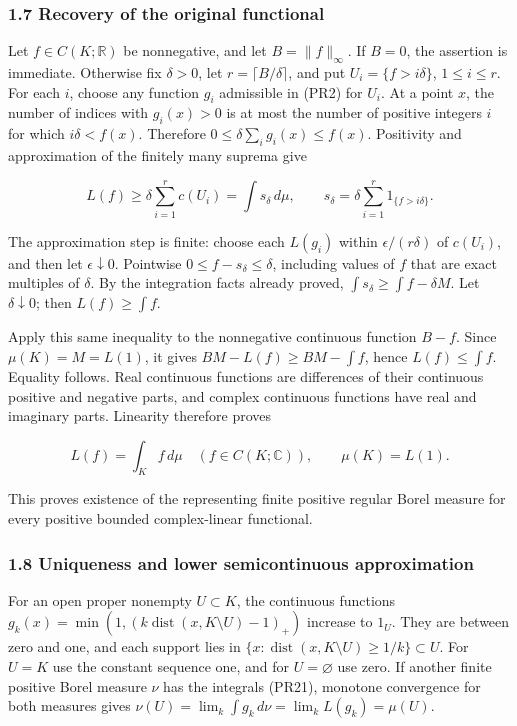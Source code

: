 \documentclass[
  11pt,
]{article}
\begin{document}
\subsubsection{1.7 Recovery of the original
functional}\label{recovery-of-the-original-functional}

Let \(f\in C(K;\mathbb R)\) be nonnegative, and let \(B=\|f\|_\infty\).
If \(B=0\), the assertion is immediate. Otherwise fix \(\delta>0\), let
\(r=\lceil B/\delta\rceil\), and put \(U_i=\{f>i\delta\}\),
\(1\leq i\leq r\). For each \(i\), choose any function \(g_i\)
admissible in (PR2) for \(U_i\). At a point \(x\), the number of indices
with \(g_i(x)>0\) is at most the number of positive integers \(i\) for
which \(i\delta<f(x)\). Therefore \(0\leq\delta\sum_i g_i(x)\leq f(x)\).
Positivity and approximation of the finitely many suprema give

\[
L(f)\geq\delta\sum_{i=1}^r c(U_i)
=\int s_\delta\,d\mu,
\qquad
s_\delta=\delta\sum_{i=1}^r1_{\{f>i\delta\}}.
\tag{PR20}
\]

The approximation step is finite: choose each \(L(g_i)\) within
\(\epsilon/(r\delta)\) of \(c(U_i)\), and then let
\(\epsilon\downarrow0\). Pointwise \(0\leq f-s_\delta\leq\delta\),
including values of \(f\) that are exact multiples of \(\delta\). By the
integration facts already proved, \(\int s_\delta\geq\int f-\delta M\).
Let \(\delta\downarrow0\); then \(L(f)\geq\int f\).

Apply this same inequality to the nonnegative continuous function
\(B-f\). Since \(\mu(K)=M=L(1)\), it gives \(BM-L(f)\geq BM-\int f\),
hence \(L(f)\leq\int f\). Equality follows. Real continuous functions
are differences of their continuous positive and negative parts, and
complex continuous functions have real and imaginary parts. Linearity
therefore proves

\[
L(f)=\int_K f\,d\mu\quad(f\in C(K;\mathbb C)),
\qquad \mu(K)=L(1).
\tag{PR21}
\]

This proves existence of the representing finite positive regular Borel
measure for every positive bounded complex-linear functional.

\subsubsection{1.8 Uniqueness and lower semicontinuous
approximation}\label{uniqueness-and-lower-semicontinuous-approximation}

For an open proper nonempty \(U\subset K\), the continuous functions
\(g_k(x)=\min(1,(k\operatorname{dist}(x,K\setminus U)-1)_+)\) increase
to \(1_U\). They are between zero and one, and each support lies in
\(\{x:\operatorname{dist}(x,K\setminus U)\geq1/k\}\subset U\). For
\(U=K\) use the constant sequence one, and for \(U=\varnothing\) use
zero. If another finite positive Borel measure \(\nu\) has the integrals
(PR21), monotone convergence for both measures gives
\(\nu(U)=\lim_k\int g_k\,d\nu=\lim_kL(g_k)=\mu(U)\).
\end{document}
